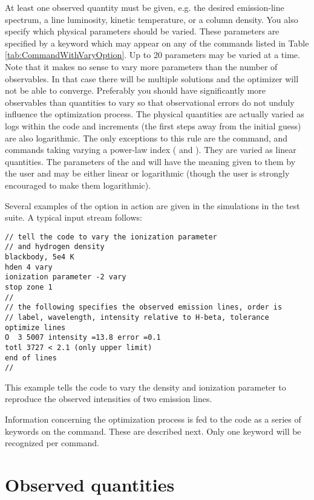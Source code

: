 At least one observed quantity must be given, e.g. the desired emission-line spectrum, a line luminosity,
kinetic temperature, or a column density.
You also specify
which physical parameters should be varied.
These parameters are specified by a
keyword  which may appear on any of the
commands listed in
Table \ref{tab:CommandWithVaryOption}.
Up to 20 parameters may be varied at a time.
Note that it makes no sense to vary more parameters than the number of observables.
In that case there will be multiple solutions and the optimizer will not be able to
converge. Preferably you should have significantly more observables than quantities
to vary so that observational errors do not unduly influence the optimization process.
The physical quantities
are actually varied as logs within the code and increments
(the first steps away from the initial guess)
are also logarithmic. The only exceptions to this rule are the
 command, and commands taking varying a power-law index
( and ).
They are varied as linear quantities.
The parameters of the  and  will
have the meaning given to them by the user and may be either linear or
logarithmic (though the user is strongly encouraged to make them logarithmic).

Several examples of the  option in action
are given in the
 simulations in the test suite.
A typical input stream follows:
\begin{verbatim}
// tell the code to vary the ionization parameter
// and hydrogen density
blackbody, 5e4 K
hden 4 vary
ionization parameter -2 vary
stop zone 1
//
// the following specifies the observed emission lines, order is
// label, wavelength, intensity relative to H-beta, tolerance
optimize lines
O  3 5007 intensity =13.8 error =0.1
totl 3727 < 2.1 (only upper limit)
end of lines
//
\end{verbatim}
This example tells the code to vary the density and ionization parameter
to reproduce the observed intensities of two emission lines.

Information concerning the optimization process is fed to the code
as a series of keywords on the  command.
These are described next.
Only one keyword will be recognized per  command.

\section{Observed quantities}
\label{sec:observed_quantities}

